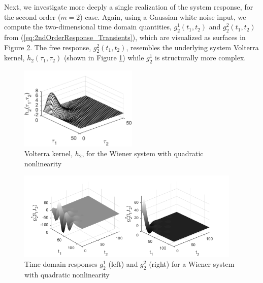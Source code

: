 Next, we investigate more deeply a single realization of the system response, for the second order ($m = 2$) case. Again, using a Gaussian white noise input, we compute the two-dimensional time domain quantities, $g_2^1(t_1,t_2)$ and $g_2^2(t_1,t_2)$ from (\ref{eq:2ndOrderResponse_Transients}), which are visualized as surfaces in Figure \ref{fig:g_21+g_22}. The free response, $g_2^2(t_1,t_2)$, resembles the underlying system Volterra kernel, $h_2(\tau_1,\tau_2)$ (shown in Figure \ref{fig:h2}) while $g_2^1$ is structurally more complex.

\begin{figure}[!h]
\centering
\includegraphics[width=0.5\textwidth]{Chapter9_NonlinTransients/h2_zoomedinmesh.pdf}
\caption{Volterra kernel, $h_2$, for the Wiener system with quadratic nonlinearity}
\label{fig:h2}
\end{figure}

%

\begin{figure}[!h]
\centering
\includegraphics[width=0.95\textwidth]{Chapter9_NonlinTransients/g_2_surfaces.png}
\caption{Time domain responses $g_2^1$ (left) and $g_2^2$ (right) for a Wiener system with quadratic nonlinearity}
\label{fig:g_21+g_22}
\end{figure}

